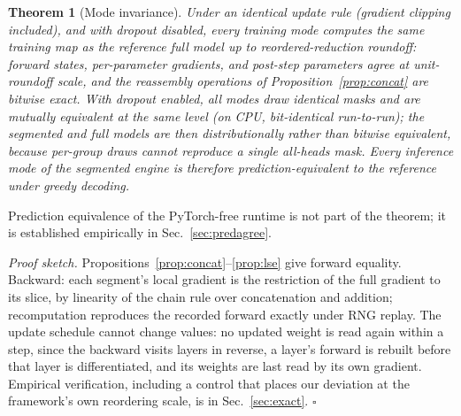\documentclass[journal]{IEEEtran}
\newtheorem{theorem}{Theorem}
\begin{document}
\begin{theorem}[Mode invariance]\label{thm:invariance}
Under an identical update rule (gradient clipping included), and with
dropout disabled, every training mode computes the same training map as
the reference full model up to reordered-reduction roundoff: forward states,
per-parameter gradients, and post-step parameters agree at unit-roundoff
scale, and the reassembly operations of Proposition~\ref{prop:concat} are
bitwise exact. With dropout enabled, all modes draw identical masks and are mutually
equivalent at the same level (on CPU, bit-identical run-to-run); the
segmented and full models are then distributionally rather than bitwise
equivalent, because per-group draws cannot reproduce a single all-heads
mask. Every inference mode of the segmented engine is therefore
prediction-equivalent to the reference under greedy decoding.
\end{theorem}
Prediction equivalence of the PyTorch-free runtime is not part of the
theorem; it is established empirically in Sec.~\ref{sec:predagree}.

\noindent\emph{Proof sketch.} Propositions~\ref{prop:concat}--\ref{prop:lse}
give forward equality. Backward: each segment's local gradient is the
restriction of the full gradient to its slice, by linearity of the chain
rule over concatenation and addition; recomputation reproduces the recorded
forward exactly under RNG replay. The update schedule cannot change values:
no updated weight is read again within a step, since the backward visits
layers in reverse, a layer's forward is rebuilt before that layer is
differentiated, and its weights are last read by its own gradient.
Empirical verification, including a control that places our deviation at
the framework's own reordering scale, is in Sec.~\ref{sec:exact}.
\hfill$\square$
\end{document}
